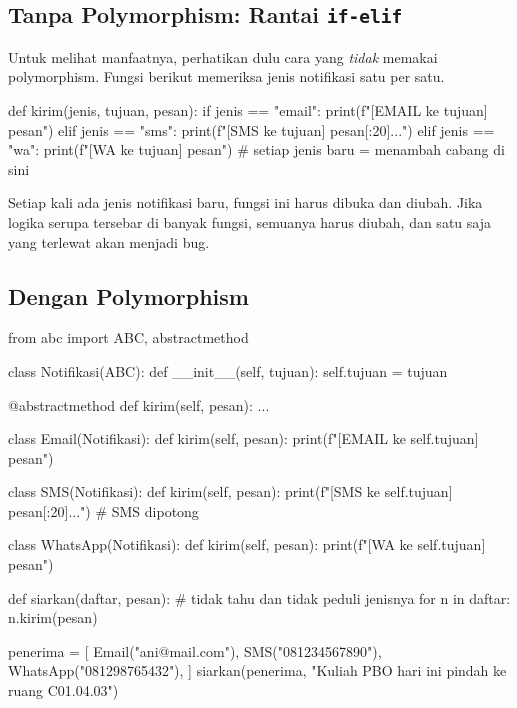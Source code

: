 \subsection{Tanpa Polymorphism: Rantai \texttt{if-elif}}

Untuk melihat manfaatnya, perhatikan dulu cara yang \emph{tidak} memakai polymorphism. Fungsi berikut memeriksa jenis notifikasi satu per satu.

\begin{kode}
def kirim(jenis, tujuan, pesan):
    if jenis == "email":
        print(f"[EMAIL ke {tujuan}] {pesan}")
    elif jenis == "sms":
        print(f"[SMS ke {tujuan}] {pesan[:20]}...")
    elif jenis == "wa":
        print(f"[WA ke {tujuan}] {pesan}")
    # setiap jenis baru = menambah cabang di sini
\end{kode}

Setiap kali ada jenis notifikasi baru, fungsi ini harus dibuka dan diubah. Jika logika serupa tersebar di banyak fungsi, semuanya harus diubah, dan satu saja yang terlewat akan menjadi bug.

\subsection{Dengan Polymorphism}

\begin{kode}[notifikasi.py]
from abc import ABC, abstractmethod

class Notifikasi(ABC):
    def __init__(self, tujuan):
        self.tujuan = tujuan

    @abstractmethod
    def kirim(self, pesan):
        ...

class Email(Notifikasi):
    def kirim(self, pesan):
        print(f"[EMAIL ke {self.tujuan}] {pesan}")

class SMS(Notifikasi):
    def kirim(self, pesan):
        print(f"[SMS ke {self.tujuan}] {pesan[:20]}...")   # SMS dipotong

class WhatsApp(Notifikasi):
    def kirim(self, pesan):
        print(f"[WA ke {self.tujuan}] {pesan}")

def siarkan(daftar, pesan):              # tidak tahu dan tidak peduli jenisnya
    for n in daftar:
        n.kirim(pesan)

penerima = [
    Email("ani@mail.com"),
    SMS("081234567890"),
    WhatsApp("081298765432"),
]
siarkan(penerima, "Kuliah PBO hari ini pindah ke ruang C01.04.03")
\end{kode}

